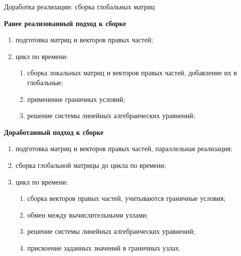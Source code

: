 \documentclass[9pt, ignoreonframetext,unicode]{beamer}
\begin{document}
\begin{frame}{Доработка реализации: сборка глобальных матриц}
	
	\textbf{Ранее реализованный подход к сборке} 

	\begin{enumerate}
	\setlength{\parskip}{0.1pt}
	\item подготовка матриц и векторов правых частей;
		
	\item цикл по времени:
	\begin{enumerate}
		\setlength{\parskip}{7pt}
		\item сборка локальных матриц и векторов правых частей, добавление их в глобальные;
		\item применение граничных условий;
		\item решение системы линейных алгебраических уравнений;	
	\end{enumerate}

\end{enumerate}
	
	\textbf{Доработанный подход к сборке}
	\begin{enumerate}
	\item подготовка матриц и векторов правых частей, параллельная реализация;
	
	\item сборка глобальной матрицы до цикла по времени;
				
	\item цикл по времени:				
		\begin{enumerate}
		\setlength{\parskip}{7pt}
		\item сборка векторов правых частей, учитываются граничные условия;
		\item обмен между вычислительными узлами;
		\item решение системы линейных алгебраических уравнений;
		\item присвоение заданных значений в граничных узлах.
	\end{enumerate}			
		\end{enumerate}
	
\end{frame}
\end{document}
